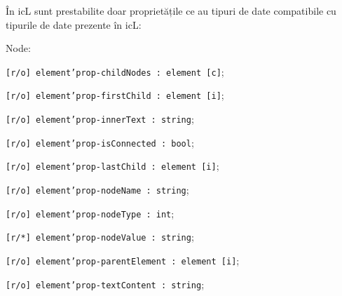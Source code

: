 În icL sunt prestabilite doar proprietățile ce au tipuri de date compatibile cu tipurile de date prezente în icL:
\begin{icItems}
	\item Node:	
	\begin{icItems}
		\item \texttt{[r/o] element'prop-childNodes : element [c]};
		\item \texttt{[r/o] element'prop-firstChild : element [i]};
		\item \texttt{[r/o] element'prop-innerText : string};
		\item \texttt{[r/o] element'prop-isConnected : bool};
		\item \texttt{[r/o] element'prop-lastChild : element [i]};
		\item \texttt{[r/o] element'prop-nodeName : string};
		\item \texttt{[r/o] element'prop-nodeType : int};
		\item \texttt{[r/*] element'prop-nodeValue : string};
		\item \texttt{[r/o] element'prop-parentElement : element [i]};
		\item \texttt{[r/o] element'prop-textContent : string};
	\end{icItems}
	

\end{icItems}
